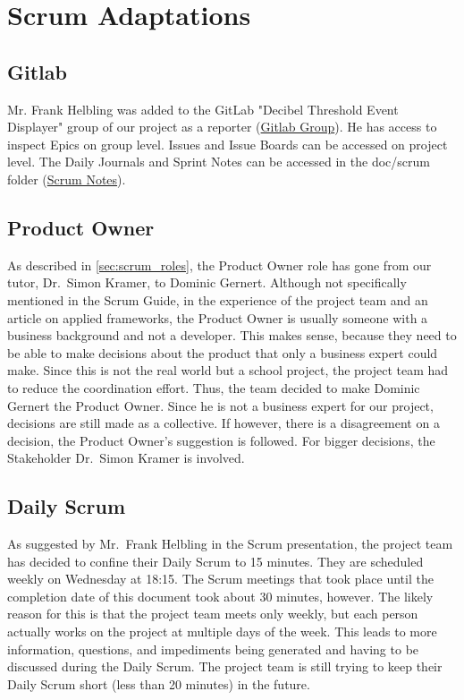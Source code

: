 \section{Scrum Adaptations}\label{sec:scrum-adaptations}
\subsection{Gitlab}
Mr. Frank Helbling was added to the GitLab "Decibel Threshold Event Displayer" group of our project as a reporter (\href{https://gitlab.ti.bfh.ch/decibel-threshold-event-displayer}{Gitlab Group}). He has access to inspect Epics on group level. Issues and Issue Boards can be accessed on project level. The Daily Journals and Sprint Notes can be accessed in the doc/scrum folder (\href{https://gitlab.ti.bfh.ch/decibel-threshold-event-displayer/decibel-threshold-event-displayer/-/tree/main/doc/scrum?ref_type=heads}{Scrum Notes}).
\subsection{Product Owner}\label{subsec:product-owner}
As described in \autoref{sec:scrum_roles}, the Product Owner role has gone from our tutor, Dr.\ Simon Kramer, to Dominic Gernert.
Although not specifically mentioned in the Scrum Guide\cite{scrum_guide}, in the experience
of the project team and an article on applied frameworks\cite{applied_frameworks_po}, the Product Owner is usually someone with a business background and not a developer.
This makes sense, because they need to be able to make decisions about the product that only a business expert could make.
Since this is not the real world but a school project, the project team had to reduce the coordination effort.
Thus, the team decided to make Dominic Gernert the Product Owner.
Since he is not a business expert for our project, decisions are still made as a collective.
If however, there is a disagreement on a decision, the Product Owner's suggestion is followed.
For bigger decisions, the Stakeholder Dr.\ Simon Kramer is involved.
\subsection{Daily Scrum}\label{subsec:daily-scrum}
As suggested by Mr.\ Frank Helbling in the Scrum presentation\cite{helbling_scrum3}, the project team has decided to confine their Daily Scrum to 15 minutes.
They are scheduled weekly on Wednesday at 18:15.
The Scrum meetings that took place until the completion date of this document took about 30 minutes, however.
The likely reason for this is that the project team meets only weekly,
but each person actually works on the project at multiple days of the week.
This leads to more information, questions, and impediments being generated and having to be discussed during the Daily Scrum.
The project team is still trying to keep their Daily Scrum short (less than 20 minutes) in the future.
